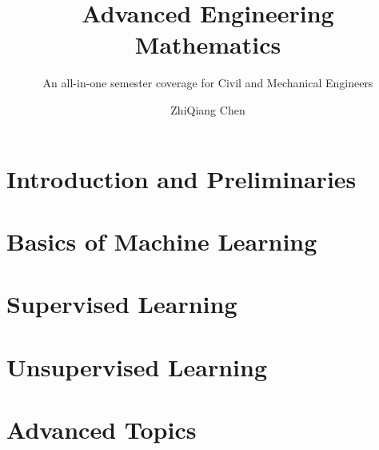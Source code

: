 \documentclass[letterpaper, american]{memoir}
\title{Advanced Engineering Mathematics}
\subtitle{An all-in-one semester coverage for Civil and Mechanical Engineers}
\author{ZhiQiang Chen}
\begin{document}
    \frontmatter        %

    \mnfrontpage


    \cleartorecto
    \tableofcontents    %
    \cleartorecto
    \listoffigures      %
    \cleartorecto
    \listoftables       %

    \mainmatter         %


    \part{Introduction and Preliminaries}
    
    
    
    \part{Basics of Machine Learning}
    
    
    \part{Supervised Learning}
    
    
    \part{Unsupervised Learning}
    
    
    \part{Advanced Topics}
    
    
    
    \appendix           %
    \appendixpage       %


    \backmatter         %

    \printbibliography
\end{document}
